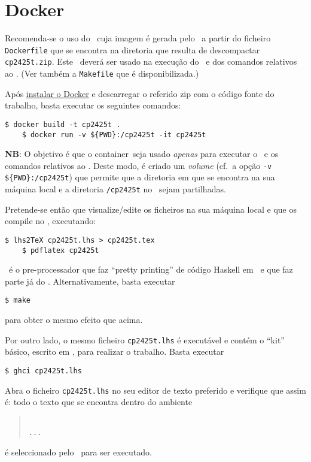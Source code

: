 \documentclass[11pt, a4paper, fleqn]{article}
\begin{document}
\section{Docker} \label{sec:docker}

Recomenda-se o uso do \container\ cuja imagem é gerada pelo \Docker\ a partir do ficheiro
\texttt{Dockerfile} que se encontra na diretoria que resulta de descompactar
\texttt{cp2425t.zip}. Este \container\ deverá ser usado na execução
do \GHCi\ e dos comandos relativos ao \Latex. (Ver também a \texttt{Makefile}
que é disponibilizada.)

Após \href{https://docs.docker.com/engine/install/}{instalar o Docker} e
descarregar o referido zip com o código fonte do trabalho,
basta executar os seguintes comandos:
\begin{Verbatim}[fontsize=\small]
    $ docker build -t cp2425t .
    $ docker run -v ${PWD}:/cp2425t -it cp2425t
\end{Verbatim}
\textbf{NB}: O objetivo é que o container\ seja usado \emph{apenas} 
para executar o \GHCi\ e os comandos relativos ao \Latex.
Deste modo, é criado um \textit{volume} (cf.\ a opção \texttt{-v \$\{PWD\}:/cp2425t}) 
que permite que a diretoria em que se encontra na sua máquina local 
e a diretoria \texttt{/cp2425t} no \container\ sejam partilhadas.

Pretende-se então que visualize/edite os ficheiros na sua máquina local e que
os compile no \container, executando:
\begin{Verbatim}[fontsize=\small]
    $ lhs2TeX cp2425t.lhs > cp2425t.tex
    $ pdflatex cp2425t
\end{Verbatim}
\LhsToTeX\ é o pre-processador que faz ``pretty printing'' de código Haskell
em \Latex\ e que faz parte já do \container. Alternativamente, basta executar
\begin{Verbatim}[fontsize=\small]
    $ make
\end{Verbatim}
para obter o mesmo efeito que acima.

Por outro lado, o mesmo ficheiro \texttt{cp2425t.lhs} é executável e contém
o ``kit'' básico, escrito em \Haskell, para realizar o trabalho. Basta executar
\begin{Verbatim}[fontsize=\small]
    $ ghci cp2425t.lhs
\end{Verbatim}

\noindent Abra o ficheiro \texttt{cp2425t.lhs} no seu editor de texto preferido
e verifique que assim é: todo o texto que se encontra dentro do ambiente
\begin{quote}\small\tt
{}
\\ ... \\
\end{quote}
é seleccionado pelo \GHCi\ para ser executado.
\end{document}
